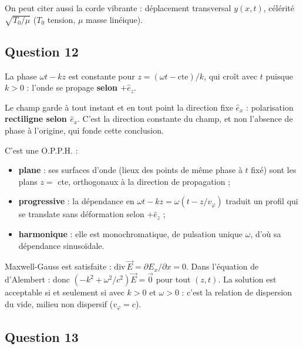 \documentclass[11pt,a4paper]{article}
\providecommand{\tightlist}{\setlength{\itemsep}{0pt}\setlength{\parskip}{0pt}}
\newcommand{\equationajustee}[1]{%
  \sbox{\boiteequation}{$\displaystyle #1$}%
  \ifdim\wd\boiteequation>\linewidth
    \[\resizebox{\linewidth}{!}{\usebox{\boiteequation}}\]%
  \else
    \[#1\]%
  \fi}
\begin{document}
On peut citer aussi la corde vibrante : déplacement transversal \(y(x,t)\), célérité \(\sqrt{T_0/\mu}\) (\(T_0\) tension, \(\mu\) masse linéique).

\hypertarget{question-12}{%
\subsection{Question 12}\label{question-12}}

La phase \(\omega t-kz\) est constante pour \(z=(\omega t-\text{cte})/k\), qui croît avec \(t\) puisque \(k>0\) : l'onde se propage \textbf{selon \(+\hat e_z\)}.

Le champ garde à tout instant et en tout point la direction fixe \(\hat e_x\) : polarisation \textbf{rectiligne selon \(\hat e_x\)}. C'est la direction constante du champ, et non l'absence de phase à l'origine, qui fonde cette conclusion.

C'est une O.P.P.H. :

\begin{itemize}
\tightlist
\item
  \textbf{plane} : ses surfaces d'onde (lieux des points de même phase à \(t\) fixé) sont les plans \(z=\) cte, orthogonaux à la direction de propagation ;
\item
  \textbf{progressive} : la dépendance en \(\omega t-kz=\omega(t-z/v_\varphi)\) traduit un profil qui se translate sans déformation selon \(+\hat e_z\) ;
\item
  \textbf{harmonique} : elle est monochromatique, de pulsation unique \(\omega\), d'où sa dépendance sinusoïdale.
\end{itemize}

Maxwell-Gauss est satisfaite : \(\mathrm{div}\,\vec E=\partial E_x/\partial x=0\). Dans l'équation de d'Alembert :
\equationajustee{\begin{aligned}
\vec\Delta\vec E&=-k^2\vec E\\
\frac{\partial^2\vec E}{\partial t^2}&=-\omega^2\vec E
\end{aligned}}
donc \((-k^2+\omega^2/c^2)\vec E=\vec 0\) pour tout \((z,t)\). La solution est acceptable si et seulement si
\equationajustee{\boxed{k=\frac{\omega}{c}}}
avec \(k>0\) et \(\omega>0\) : c'est la relation de dispersion du vide, milieu non dispersif (\(v_\varphi=c\)).

\hypertarget{question-13}{%
\subsection{Question 13}\label{question-13}}
\end{document}

